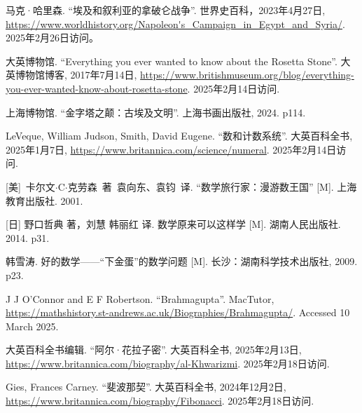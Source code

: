 马克·哈里森. ``埃及和叙利亚的拿破仑战争''. 世界史百科，2023年4月27日, \url{https://www.worldhistory.org/Napoleon's_Campaign_in_Egypt_and_Syria/}. 2025年2月26日访问。


大英博物馆. ``Everything you ever wanted to know about the Rosetta Stone''. 大英博物馆博客, 2017年7月14日, \url{https://www.britishmuseum.org/blog/everything-you-ever-wanted-know-about-rosetta-stone}. 2025年2月14日访问.


上海博物馆. ``金字塔之颠：古埃及文明''. 上海书画出版社, 2024. p114. %

LeVeque, William Judson, Smith, David Eugene. ``数和计数系统''. 大英百科全书, 2025年1月7日, \url{https://www.britannica.com/science/numeral}. 2025年2月14日访问.


[美]\ 卡尔文$\cdot$C$\cdot$克劳森\ 著\ 袁向东、袁钧\ 译. ``数学旅行家：漫游数王国'' [M]. 上海教育出版社. 2001. %

[日] 野口哲典 著，刘慧 韩丽红 译. 数学原来可以这样学 [M]. 湖南人民出版社. 2014. p31. %

韩雪涛. 好的数学——“下金蛋”的数学问题 [M]. 长沙：湖南科学技术出版社, 2009. p23. %

J J O'Connor and E F Robertson. ``Brahmagupta''. MacTutor, \url{https://mathshistory.st-andrews.ac.uk/Biographies/Brahmagupta/}. Accessed 10 March 2025.

大英百科全书编辑. ``阿尔·花拉子密''. 大英百科全书, 2025年2月13日, \url{https://www.britannica.com/biography/al-Khwarizmi}. 2025年2月18日访问.


Gies, Frances Carney. ``斐波那契''. 大英百科全书, 2024年12月2日, \url{https://www.britannica.com/biography/Fibonacci}. 2025年2月18日访问.
